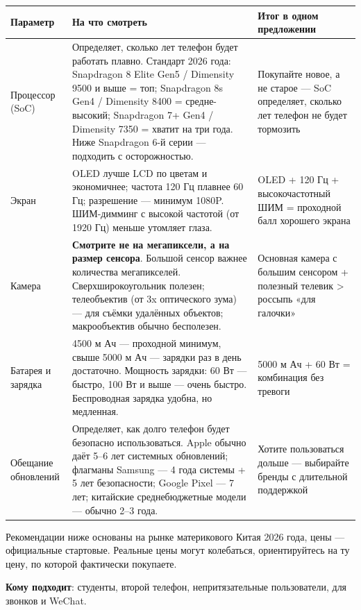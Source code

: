 \begin{center}
\begin{tabularx}{\linewidth}{|X|X|X|}
\hline
\textbf{Параметр} & \textbf{На что смотреть} & \textbf{Итог в одном предложении} \tabularnewline
\hline
Процессор (SoC) & Определяет, сколько лет телефон будет работать плавно. Стандарт 2026 года: Snapdragon 8 Elite Gen5 / Dimensity 9500 и выше = топ; Snapdragon 8s Gen4 / Dimensity 8400 = средне-высокий; Snapdragon 7+ Gen4 / Dimensity 7350 = хватит на три года. Ниже Snapdragon 6-й серии — подходить с осторожностью. & Покупайте новое, а не старое — SoC определяет, сколько лет телефон не будет тормозить \tabularnewline
Экран & OLED лучше LCD по цветам и экономичнее; частота 120 Гц плавнее 60 Гц; разрешение — минимум 1080P. ШИМ-димминг с высокой частотой (от 1920 Гц) меньше утомляет глаза. & OLED + 120 Гц + высокочастотный ШИМ = проходной балл хорошего экрана \tabularnewline
Камера & \textbf{Смотрите не на мегапиксели, а на размер сенсора}. Большой сенсор важнее количества мегапикселей. Сверхширокоугольник полезен; телеобъектив (от 3x оптического зума) — для съёмки удалённых объектов; макрообъектив обычно бесполезен. & Основная камера с большим сенсором + полезный телевик > россыпь «для галочки» \tabularnewline
Батарея и зарядка & 4500 м Ач — проходной минимум, свыше 5000 м Ач — зарядки раз в день достаточно. Мощность зарядки: 60 Вт — быстро, 100 Вт и выше — очень быстро. Беспроводная зарядка удобна, но медленная. & 5000 м Ач + 60 Вт = комбинация без тревоги \tabularnewline
Обещание обновлений & Определяет, как долго телефон будет безопасно использоваться. Apple обычно даёт 5–6 лет системных обновлений; флагманы Samsung — 4 года системы + 5 лет безопасности; Google Pixel — 7 лет; китайские среднебюджетные модели — обычно 2–3 года. & Хотите пользоваться дольше — выбирайте бренды с длительной поддержкой \tabularnewline
\hline
\end{tabularx}
\end{center}


Рекомендации ниже основаны на рынке материкового Китая 2026 года, цены — официальные стартовые. Реальные цены могут колебаться, ориентируйтесь на ту цену, по которой фактически покупаете.


\textbf{Кому подходит}: студенты, второй телефон, непритязательные пользователи, для звонков и WeChat.

